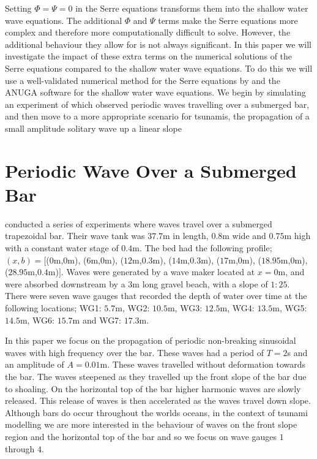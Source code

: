 \documentclass[a4paper,fleqn]{article} %
\begin{document}
Setting $\Phi = \Psi = 0$ in the Serre equations transforms them into the shallow water wave equations. The additional $\Phi$ and $\Psi$ terms make the Serre equations more complex and therefore more computationally difficult to solve. However, the additional behaviour they allow for is not always significant. In this paper we will investigate the impact of these extra terms on the numerical solutions of the Serre equations compared to the shallow water wave equations. To do this we will use a well-validated numerical method for the Serre equations by \cite{Zoppou-etal-2017} and the ANUGA software for the shallow water wave equations. We begin by simulating an experiment of \cite{Beji-Battjes-1994} which observed periodic waves travelling over a submerged bar, and then move to a more appropriate scenario for tsunamis, the propagation of a small amplitude solitary wave up a linear slope

\section{Periodic Wave Over a Submerged Bar}
\label{Oscillatory Wave Over a Submerged Bar}
\cite{Beji-Battjes-1994} conducted a series of experiments where waves travel over a submerged trapezoidal bar. Their wave tank was $37.7$m in length, $0.8$m wide and $0.75$m high with a constant water stage of $0.4$m. The bed had the following profile; $(x,b) = [$($0$m,$0$m), ($6$m,$0$m), ($12$m,$0.3$m), ($14$m,$0.3$m), ($17$m,$0$m), ($18.95$m,$0$m), ($28.95$m,$0.4$m)$]$. Waves were generated by a wave maker located at $x=0$m, and were absorbed downstream by a $3$m long gravel beach, with a slope of $1:25$. There were seven wave gauges that recorded the depth of water over time at the following locations; WG1: $5.7$m, WG2: $10.5$m, WG3: $12.5$m, WG4: $13.5$m, WG5: $14.5$m, WG6: $15.7$m and WG7: $17.3$m.

In this paper we focus on the propagation of periodic non-breaking sinusoidal waves with high frequency over the bar. These waves had a period of $T = 2$s and an amplitude of $A = 0.01$m. These waves travelled without deformation towards the bar. The waves steepened as they travelled up the front slope of the bar due to shoaling. On the horizontal top of the bar higher harmonic waves are slowly released. This release of waves is then accelerated as the waves travel down slope. Although bars do occur throughout the worlds oceans, in the context of tsunami modelling we are more interested in the behaviour of waves on the front slope region and the horizontal top of the bar and so we focus on wave gauges $1$ through $4$. 
\end{document}
